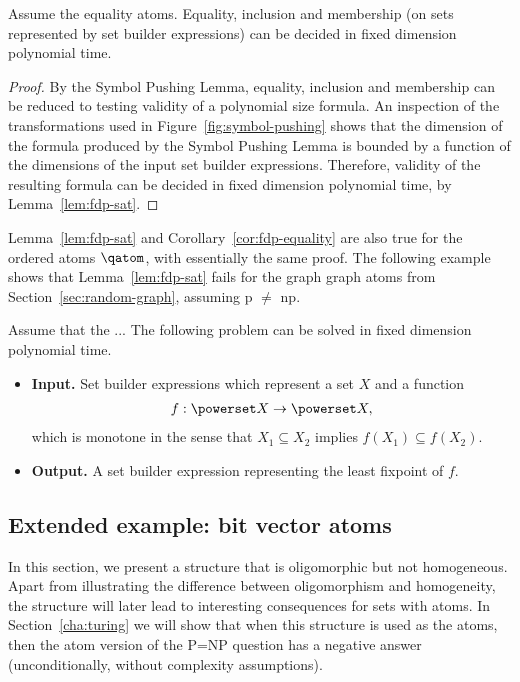 \begin{corollary} \label{cor:fdp-equality} Assume the equality atoms. 
 Equality, inclusion and membership (on sets represented by set builder expressions) can be decided in fixed dimension polynomial time.
\end{corollary} 
\begin{proof}
 By the Symbol Pushing Lemma, equality, inclusion and membership can be reduced to testing validity of a polynomial size formula. An inspection of the transformations used in Figure~\ref{fig:symbol-pushing} shows that the dimension of the formula produced by the Symbol Pushing Lemma is bounded by a function of the dimensions of the input set builder expressions. Therefore, validity of the resulting formula can be decided in fixed dimension polynomial time, by Lemma~\ref{lem:fdp-sat}.
\end{proof}
Lemma~\ref{lem:fdp-sat} and Corollary~\ref{cor:fdp-equality} are also true for the ordered atoms $\qatom$, with essentially the same proof. The following example shows that Lemma~\ref{lem:fdp-sat} fails for the graph graph atoms from Section~\ref{sec:random-graph}, assuming {\sc p $\neq$ np}. 

 



\begin{lemma}
 Assume that the ... The following problem can be solved in fixed dimension polynomial time. 
 \begin{itemize} 
 \item {\bf Input.} Set builder expressions which represent a set $X$ and a function 
 \begin{align*}
 f : \powerset X \to \powerset X,
 \end{align*}
 which is monotone in the sense that $X_1 \subseteq X_2$ implies $f(X_1) \subseteq f(X_2)$. 
 \item {\bf Output.} A set builder expression representing the least fixpoint of $f$. 
 \end{itemize}
\end{lemma}


\subsection{Extended example: bit vector atoms}
\label{sec:vector-spaces-oligo}
In this section, we present a structure that is oligomorphic but not homogeneous. Apart from illustrating the difference between oligomorphism and homogeneity, the structure will later lead to interesting consequences for sets with atoms.
 In Section~\ref{cha:turing} we will show that when this structure is used as the atoms, then the atom version of the P=NP question has a negative answer (unconditionally, without complexity assumptions).

